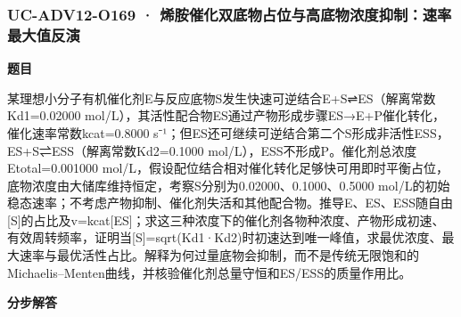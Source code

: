 \documentclass[UTF8,11pt,a4paper]{ctexart}
\begin{document}
\subsubsection*{UC-ADV12-O169 · 烯胺催化双底物占位与高底物浓度抑制：速率最大值反演}
\noindent\textbf{题目}\par
某理想小分子有机催化剂E与反应底物S发生快速可逆结合E+S⇌ES（解离常数Kd1=0.02000 mol/L），其活性配合物ES通过产物形成步骤ES→E+P催化转化，催化速率常数kcat=0.8000 s⁻¹；但ES还可继续可逆结合第二个S形成非活性ESS，ES+S⇌ESS（解离常数Kd2=0.1000 mol/L），ESS不形成P。催化剂总浓度Etotal=0.001000 mol/L，假设配位结合相对催化转化足够快可用即时平衡占位，底物浓度由大储库维持恒定，考察S分别为0.02000、0.1000、0.5000 mol/L的初始稳态速率；不考虑产物抑制、催化剂失活和其他配合物。推导E、ES、ESS随自由[S]的占比及v=kcat[ES]；求这三种浓度下的催化剂各物种浓度、产物形成初速、有效周转频率，证明当[S]=sqrt(Kd1·Kd2)时初速达到唯一峰值，求最优浓度、最大速率与最优活性占比。解释为何过量底物会抑制，而不是传统无限饱和的Michaelis–Menten曲线，并核验催化剂总量守恒和ES/ESS的质量作用比。\par
\medskip\noindent\textbf{分步解答}
\end{document}
